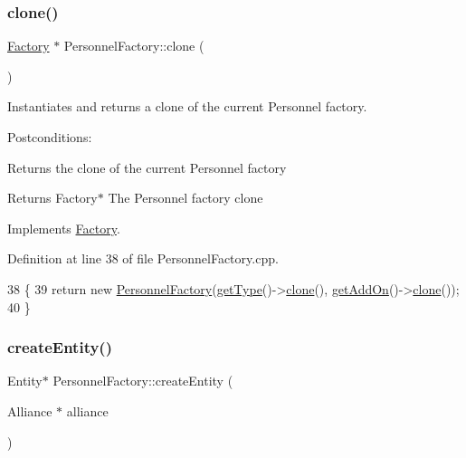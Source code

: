 \subsubsection{\texorpdfstring{clone()}{clone()}}
{\footnotesize\ttfamily \hyperlink{classFactory}{Factory} $\ast$ Personnel\+Factory\+::clone (\begin{DoxyParamCaption}{ }\end{DoxyParamCaption})\hspace{0.3cm}{\ttfamily [virtual]}}



Instantiates and returns a clone of the current Personnel factory. 

Postconditions\+:
\begin{DoxyItemize}
\item Returns the clone of the current Personnel factory
\end{DoxyItemize}

\begin{DoxyReturn}{Returns}
Factory$\ast$ The Personnel factory clone 
\end{DoxyReturn}


Implements \hyperlink{classFactory_a00881ec5050751e4b747db5dfd266192}{Factory}.



Definition at line 38 of file Personnel\+Factory.\+cpp.


\begin{DoxyCode}
38                                  \{
39     \textcolor{keywordflow}{return} \textcolor{keyword}{new} \hyperlink{classPersonnelFactory_a71cd406976230cacebfcfd723d2a2615}{PersonnelFactory}(\hyperlink{classFactory_ac91051006ace7ec5bb6ecf0fe6d02d58}{getType}()->\hyperlink{classPersonnelFactory_ad60e8371e52153294112b16a7a97cc2d}{clone}(), 
      \hyperlink{classFactory_a994153930f59cafb280e91d5b100b5aa}{getAddOn}()->\hyperlink{classPersonnelFactory_ad60e8371e52153294112b16a7a97cc2d}{clone}());
40 \}
\end{DoxyCode}
\mbox{\label{classPersonnelFactory_abc720e96cd8f136156c8f427a2489653}} 
\subsubsection{\texorpdfstring{create\+Entity()}{createEntity()}}
{\footnotesize\ttfamily Entity$\ast$ Personnel\+Factory\+::create\+Entity (\begin{DoxyParamCaption}\item[{Alliance $\ast$}]{alliance }\end{DoxyParamCaption})\hspace{0.3cm}{\ttfamily [virtual]}}



